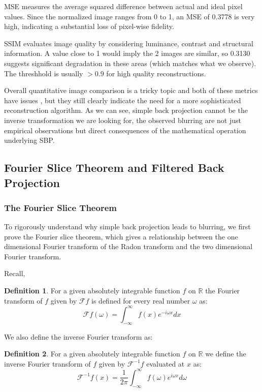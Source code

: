 \documentclass{article}
\theoremstyle{definition}
\newtheorem{definition}{Definition}[section]
\begin{document}
MSE measures the average squared difference between actual and ideal pixel values. Since the normalized image ranges from 0 to 1, an MSE of 0.3778 is very high, indicating a substantial loss of pixel-wise fidelity.

SSIM evaluates image quality by considering luminance, contrast and structural information. A value close to 1 would imply the 2 images are similar, so 0.3130 suggests significant degradation in these areas (which matches what we observe). The threshhold is usually $> 0.9$ for high quality reconstructions.

Overall quantitative image comparison is a tricky topic and both of these metrics have issues \cite{Nilsson2020}, but they still clearly indicate the need for a more sophisticated reconstruction algorithm. As we can see, simple back projection cannot be the inverse transformation we are looking for, the observed blurring are not just empirical observations but direct consequences of the mathematical operation underlying SBP.

\subsection{Fourier Slice Theorem and Filtered Back Projection}
\subsubsection{The Fourier Slice Theorem}
To rigorously understand why simple back projection leads to blurring, we first prove the Fourier slice theorem, which gives a relationship between the one dimensional Fourier transform of the Radon transform and the two dimensional Fourier transform.

Recall,
\begin{definition}
For a given absolutely integrable function $f$ on $\mathbb{R}$ the Fourier transform of $f$ given by $\mathcal{F}f$ is defined for every real number $\omega$ as:
$$
\mathcal{F}f(\omega) = \int_{-\infty}^{\infty} f(x) e^{- i \omega x}dx
$$
\end{definition}

We also define the inverse Fourier transform as:

\begin{definition}
For a given absolutely integrable function $f$ on $\mathbb{R}$ we define the inverse Fourier transform of $f$ given by $\mathcal{F}^{-1}f$ evaluated at $x$ as:
$$
\mathcal{F}^{-1}f(x) = \frac{1}{2 \pi} \int_{-\infty}^{\infty} f(\omega) e^{i \omega x}d\omega
$$
\end{definition}
\end{document}
